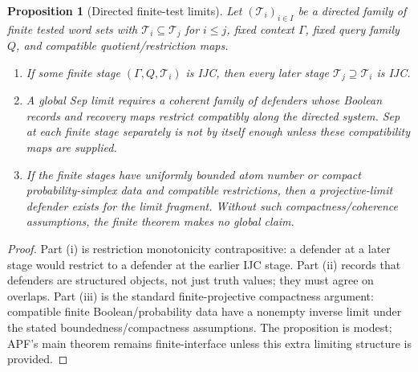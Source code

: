 \documentclass[11pt]{article}
\newtheorem{proposition}[theorem]{Proposition}
\begin{document}
\begin{proposition}[Directed finite-test limits]\label{prop:directed-finite-test-limits}
Let $(\mathcal T_i)_{i\in I}$ be a directed family of finite tested word sets with $\mathcal T_i\subseteq\mathcal T_j$ for $i\le j$, fixed context $\Gamma$, fixed query family $Q$, and compatible quotient/restriction maps.
\begin{enumerate}[label=(\roman*),leftmargin=2em]
\item If some finite stage $(\Gamma,Q,\mathcal T_i)$ is IJC, then every later stage $\mathcal T_j\supseteq\mathcal T_i$ is IJC.
\item A global Sep limit requires a coherent family of defenders whose Boolean records and recovery maps restrict compatibly along the directed system.  Sep at each finite stage separately is not by itself enough unless these compatibility maps are supplied.
\item If the finite stages have uniformly bounded atom number or compact probability-simplex data and compatible restrictions, then a projective-limit defender exists for the limit fragment.  Without such compactness/coherence assumptions, the finite theorem makes no global claim.
\end{enumerate}
\end{proposition}
\begin{proof}
Part (i) is restriction monotonicity contrapositive: a defender at a later stage would restrict to a defender at the earlier IJC stage.  Part (ii) records that defenders are structured objects, not just truth values; they must agree on overlaps.  Part (iii) is the standard finite-projective compactness argument: compatible finite Boolean/probability data have a nonempty inverse limit under the stated boundedness/compactness assumptions.  The proposition is modest; APF's main theorem remains finite-interface unless this extra limiting structure is provided.
\end{proof}
\end{document}

